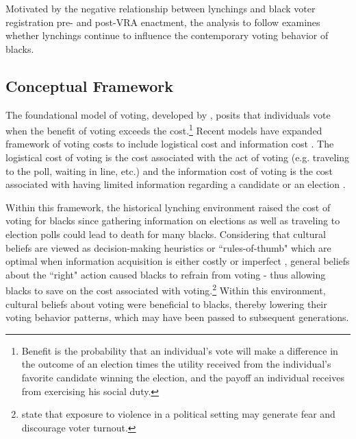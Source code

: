 \documentclass[AEJ, finalmode]{AEA}
\begin{document}
Motivated by the negative relationship between lynchings and black voter registration pre- and post-VRA enactment, the analysis to follow examines whether lynchings continue to influence the contemporary voting behavior of blacks.

\subsection{Conceptual Framework}

The foundational model of voting, developed by , posits that individuals vote when the benefit of voting exceeds the cost.\footnote{Benefit is the probability that an individual's vote will make a difference in the outcome of an election times the utility received from the individual's favorite candidate winning the election, and the payoff an individual receives from exercising his social duty.} Recent models have expanded  framework of voting costs to include logistical cost and information cost \cite{matsusaka1995explaining,ashworth2007targeted,charles2013employment}. The logistical cost of voting is the cost associated with the act of voting (e.g. traveling to the poll, waiting in line, etc.) and the information cost of voting is the cost associated with having limited information regarding a candidate or an election \cite{charles2013employment}. 

Within this framework, the historical lynching environment raised the cost of voting for blacks since gathering information on elections as well as traveling to election polls could lead to death for many blacks. Considering that cultural beliefs are viewed as decision-making heuristics or ``rules-of-thumb" which are optimal when information acquisition is either costly or imperfect \cite{nunn2011slave,alesina2013origins}, general beliefs about the ``right" action caused blacks to refrain from voting - thus allowing blacks to save on the cost associated with voting.\footnote{ state that exposure to violence in a political setting may generate fear and discourage voter turnout.} Within this environment, cultural beliefs about voting were beneficial to blacks, thereby lowering their voting behavior patterns, which may have been passed to subsequent generations. 
\end{document}
